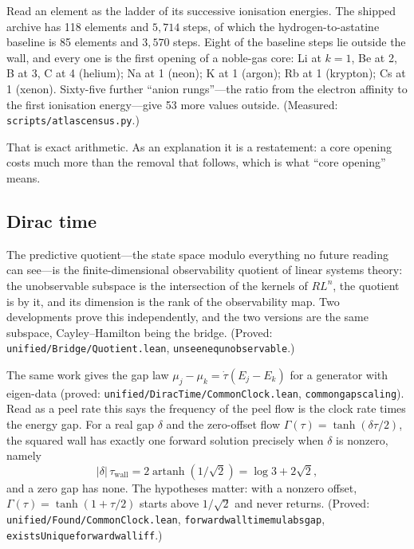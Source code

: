 \documentclass[11pt]{article}
\newcommand{\G}{\Gamma}
\renewcommand{\_}{\origunderscore\allowbreak}
\newcommand{\W}{3+2\sqrt{2}}
\begin{document}
Read an element as the ladder of its successive ionisation energies. The shipped archive has 118
elements and $5{,}714$ steps, of which the hydrogen-to-astatine baseline is 85 elements and
$3{,}570$ steps. Eight of the baseline steps lie outside the wall, and every one is the first
opening of a noble-gas core: Li at $k=1$, Be at 2, B at 3, C at 4 (helium); Na at 1 (neon); K at 1
(argon); Rb at 1 (krypton); Cs at 1 (xenon). Sixty-five further ``anion rungs''---the ratio from
the electron affinity to the first ionisation energy---give 53 more values outside.
(Measured: \texttt{scripts/atlas\_census.py}.)

That is exact arithmetic. As an explanation it is a restatement: a core opening costs much more
than the removal that follows, which is what ``core opening'' means.

\subsection{Dirac time}

The predictive quotient---the state space modulo everything no future reading can see---is the
finite-dimensional observability quotient of linear systems theory: the unobservable subspace is
the intersection of the kernels of $RL^n$, the quotient is by it, and its dimension is the rank of
the observability map. Two developments prove this independently, and the two versions are the
same subspace, Cayley--Hamilton being the bridge. (Proved: \texttt{unified/Bridge/Quotient.lean},
\texttt{unseen\_eq\_unobservable}.)

The same work gives the gap law $\mu_j-\mu_k=\dot\tau(E_j-E_k)$ for a generator with eigen-data
(proved: \texttt{unified/DiracTime/CommonClock.lean}, \texttt{common\_gap\_scaling}). Read as a
peel rate this says the frequency of the peel flow is the clock rate times the energy gap. For a
real gap $\delta$ and the zero-offset flow $\G(\tau)=\tanh(\delta\tau/2)$, the squared wall has
exactly one forward solution precisely when $\delta$ is nonzero, namely
\begin{equation}
|\delta|\,\tau_{\text{wall}}=2\operatorname{artanh}(1/\sqrt2)=\log\W, \label{eq:walltime}
\end{equation}
and a zero gap has none. The hypotheses matter: with a nonzero offset, $\G(\tau)=\tanh(1+\tau/2)$
starts above $1/\sqrt2$ and never returns. (Proved: \texttt{unified/Found/CommonClock.lean},
\texttt{forward\_wall\_time\_mul\_abs\_gap}, \texttt{existsUnique\_forward\_wall\_iff}.)
\end{document}

